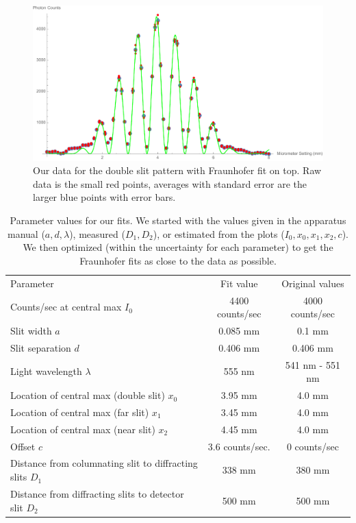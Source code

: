 \documentclass[prb,preprint]{revtex4-1}
\begin{document}
\begin{figure}[h!]
\centering
\includegraphics[width=6in]{double_slit_Fraunhofer_plot.pdf}
\caption{Our data for the double slit pattern with Fraunhofer fit on top.  Raw data is the small red points, averages with standard error are the larger blue points with error bars. }
\label{double_slit_Fraunhofer_plot}
\end{figure}

\begin{table}[h!]
\centering
\caption{Parameter values for our fits. We started with the values given in the apparatus manual ($a, d, \lambda$), measured ($D_1, D_2$), or estimated from the plots ($I_0, x_0, x_1, x_2, c$).  We then optimized (within the uncertainty for each parameter) to get the Fraunhofer fits as close to the data as possible. }
\begin{ruledtabular}
\begin{tabular}{lcc}
Parameter & Fit value & Original values      \\
Counts/sec at central max $I_0$     & 4400 counts/sec &  4000 counts/sec\\
Slit width $a$       & 0.085 mm        & 0.1 mm\\
Slit separation $d$       & 0.406 mm        & 0.406 mm\\
Light wavelength $\lambda$ & 555 nm          & 541 nm - 551 nm\\
Location of central max (double slit) $x_0$     & 3.95 mm         & 4.0 mm\\
Location of central max (far slit) $x_1$     & 3.45 mm & 4.0 mm\\
Location of central max (near slit) $x_2$ & 4.45 mm & 4.0 mm\\
Offset $c$       & 3.6 counts/sec. & 0 counts/sec\\
Distance from columnating slit to diffracting slits $D_1$     & 338 mm         & 380 mm\\
Distance from diffracting slits to detector slit $D_2$     & 500 mm         & 500 mm
\end{tabular}
\end{ruledtabular}
\label{parameters}
\end{table}
\end{document}
